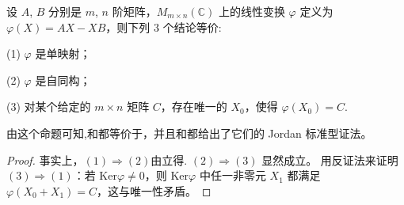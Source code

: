 \documentclass[../../main.tex]{subfiles}
\begin{document}
\begin{proposition}\label{proposition:AX-XB线性映射相关等价条件}
设 $A$, $B$ 分别是 $m$, $n$ 阶矩阵，$M_{m\times n}(\mathbb{C})$ 上的线性变换 $\varphi$ 定义为 $\varphi(X) = AX - XB$，则下列 3 个结论等价:

(1) $\varphi$ 是单映射；

(2) $\varphi$ 是自同构；

(3) 对某个给定的 $m \times n$ 矩阵 $C$，存在唯一的 $X_0$，使得 $\varphi(X_0) = C$.
\end{proposition}
\begin{remark}
由这个命题可知,和都等价于，并且和都给出了它们的 Jordan 标准型证法。
\end{remark}
\begin{proof}
事实上，$(1) \Rightarrow (2)$由立得. 
$(2) \Rightarrow (3)$ 显然成立。
用反证法来证明 $(3) \Rightarrow (1)$：若 $\mathrm{Ker}\varphi \neq 0$，则 $\mathrm{Ker}\varphi$ 中任一非零元 $X_1$ 都满足 $\varphi(X_0 + X_1) = C$，这与唯一性矛盾。

\end{proof}
\end{document}
